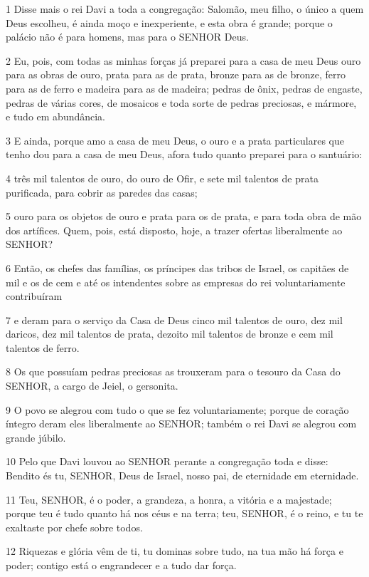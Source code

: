 \par 1 Disse mais o rei Davi a toda a congregação: Salomão, meu filho, o único a quem Deus escolheu, é ainda moço e inexperiente, e esta obra é grande; porque o palácio não é para homens, mas para o SENHOR Deus.
\par 2 Eu, pois, com todas as minhas forças já preparei para a casa de meu Deus ouro para as obras de ouro, prata para as de prata, bronze para as de bronze, ferro para as de ferro e madeira para as de madeira; pedras de ônix, pedras de engaste, pedras de várias cores, de mosaicos e toda sorte de pedras preciosas, e mármore, e tudo em abundância.
\par 3 E ainda, porque amo a casa de meu Deus, o ouro e a prata particulares que tenho dou para a casa de meu Deus, afora tudo quanto preparei para o santuário:
\par 4 três mil talentos de ouro, do ouro de Ofir, e sete mil talentos de prata purificada, para cobrir as paredes das casas;
\par 5 ouro para os objetos de ouro e prata para os de prata, e para toda obra de mão dos artífices. Quem, pois, está disposto, hoje, a trazer ofertas liberalmente ao SENHOR?
\par 6 Então, os chefes das famílias, os príncipes das tribos de Israel, os capitães de mil e os de cem e até os intendentes sobre as empresas do rei voluntariamente contribuíram
\par 7 e deram para o serviço da Casa de Deus cinco mil talentos de ouro, dez mil daricos, dez mil talentos de prata, dezoito mil talentos de bronze e cem mil talentos de ferro.
\par 8 Os que possuíam pedras preciosas as trouxeram para o tesouro da Casa do SENHOR, a cargo de Jeiel, o gersonita.
\par 9 O povo se alegrou com tudo o que se fez voluntariamente; porque de coração íntegro deram eles liberalmente ao SENHOR; também o rei Davi se alegrou com grande júbilo.
\par 10 Pelo que Davi louvou ao SENHOR perante a congregação toda e disse: Bendito és tu, SENHOR, Deus de Israel, nosso pai, de eternidade em eternidade.
\par 11 Teu, SENHOR, é o poder, a grandeza, a honra, a vitória e a majestade; porque teu é tudo quanto há nos céus e na terra; teu, SENHOR, é o reino, e tu te exaltaste por chefe sobre todos.
\par 12 Riquezas e glória vêm de ti, tu dominas sobre tudo, na tua mão há força e poder; contigo está o engrandecer e a tudo dar força.
